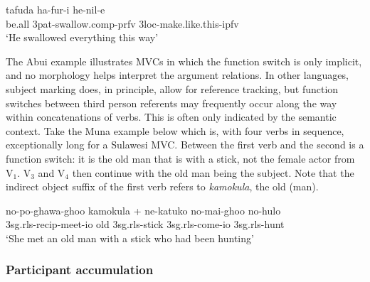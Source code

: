 \ea \label{abui003o}
\gll tafuda ha-fur-i he-nil-e \\
be.all 3\acs{pat}-swallow.\acs{comp}-\acs{prfv} 3\acs{loc}-make.like.this-\acs{ipfv} \\
\glft `He swallowed everything this way’ \\ 
\z
\xe

The Abui example illustrates MVCs in which the function switch is only implicit, and no morphology helps interpret the argument relations. In other languages, subject marking does, in principle, allow for reference tracking, but function switches between third person referents may frequently occur along the way within concatenations of verbs. This is often only indicated by the semantic context. Take the Muna example below which is, with four verbs in sequence, exceptionally long for a Sulawesi MVC. Between the first verb and the second is a function switch: it is the old man that is with a stick, not the female actor from V$_1$. V$_3$ and V$_4$ then continue with the old man being the subject. Note that the indirect object suffix of the first verb refers to \textit{kamokula}, the old (man).

\ea \label{}
\gll no-po-ghawa-ghoo kamokula + ne-katuko no-mai-ghoo no-hulo \\
3\acs{sg}.\acs{rls}-\acs{recip}-meet-\acs{io} old 3\acs{sg}.\acs{rls}-stick 3\acs{sg}.\acs{rls}-come-\acs{io} 3\acs{sg}.\acs{rls}-hunt \\
\glft `She met an old man with a stick who had been hunting' \\ 
\z
\xe

\subsubsection{Participant accumulation}

